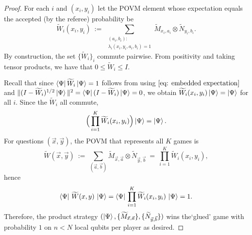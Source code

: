 \documentclass[10pt,a4paper]{amsart}
\begin{document}
\begin{proof}
    For each $i$ and $(x_i,y_i)$ let the POVM element whose expectation equals the accepted (by the referee) probability be 
    \begin{equation}
        \widetilde W_i(x_i,y_i)\ :=\ \sum_{\substack{(a_i,b_i): \\\lambda_i(x_i,y_i,a_i,b_i)=1}} \widetilde M_{x_i,a_i}\otimes \widetilde N_{y_i,b_i}.
    \end{equation}
    By construction, the set $\{\widetilde W_i\}_i$ commute pairwise. From positivity and taking tensor products, we have that $0\le \widetilde W_i\le I$. 
    
    
    Recall that since $\bra{\Psi} \widetilde W_i\ket{\Psi}=1$ follows from  using $\Cref{eq: embedded expectation}$ and $\| (I-\widetilde W_i)^{1/2}\ket{\Psi}\|^2=\bra{\Psi}(I-\widetilde W_i)\ket{\Psi}=0$, we obtain $\widetilde W_i(x_i,y_i)\ket{\Psi}=\ket{\Psi}$ for all $i$. Since the $\widetilde W_i$ all commute,
    \begin{equation}
        \Big(\prod_{i=1}^K \widetilde W_i(x_i,y_i)\Big)\ket{\Psi}=\ket{\Psi}.
    \end{equation}
   For questions $(\vec{x},\vec{y})$, the POVM that represents all $K$ games is 
    \begin{equation}
        \widetilde W(\vec{x},\vec{y})\ :=\ \sum_{(\vec{a},\vec{b})}
        \widetilde M_{\vec{x},\vec{a}}\otimes \widetilde N_{\vec{y},\vec{b}}
        \ =\ \prod_{i=1}^K \widetilde W_i(x_i,y_i),
    \end{equation}
    hence
    \begin{equation}
        \bra{\Psi}\,\widetilde W(x,y)\,\ket{\Psi}
        =\bra{\Psi}\,\prod_{i=1}^K \widetilde W_i(x_i,y_i)\,\ket{\Psi}
        =1.
    \end{equation}
    Therefore, the product strategy $(\ket{\Psi},\{\widetilde M_{\vec{x},\vec{a}}\},\{\widetilde N_{\vec{y},\vec{b}}\})$ wins the`glued' game with probability $1$ on $n<N$ local qubits per player as desired.
    \end{proof}
\end{document}
